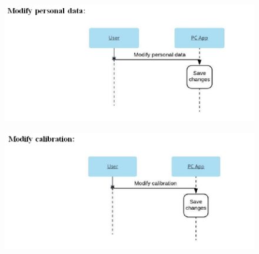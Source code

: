 \documentclass[conference,12pt]{IEEETran}
\begin{document}
\FloatBarrier
\begin{figure}[!h]
	\centering
	\includegraphics[scale=0.4]{images/Seq_Modify.png}
	\label{img:modpersdata}
\end{figure}
\FloatBarrier

\FloatBarrier
\begin{figure}[!h]
	\centering
	\includegraphics[scale=0.4]{images/Seq_Modify_Cal.png}
	\label{img:modcal}
\end{figure}
\FloatBarrier
\end{document}
